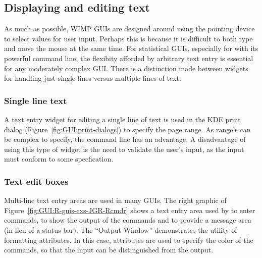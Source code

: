 \subsection{Displaying and editing text}
\label{sec:GUI:text-widgets}

As much as possible, WIMP GUIs are designed around using the pointing
device to select values for user input. Perhaps this is because it is
difficult to both type and move the mouse at the same time. For
statistical GUIs, especially for \R\/ with its powerful command line,
the flexibity afforded by arbitrary text entry is essential for any
moderately complex GUI. There is a distinction made between widgets
for handling just single lines versus multiple lines of text.

\subsubsection{Single line text}
\label{sec:GUI:single-line-text}

A text entry widget for editing a single line of text is used in the
KDE print dialog (Figure~\ref{fig:GUI:print-dialogs}) to specify
the page range. As range's can be complex to specify, the command line
has an advantage. A disadvantage of using this type of widget is the need to
validate the user's input, as the input must conform to some specfication.

\subsubsection{Text edit boxes}
\label{sec:GUI:textboxes}

Multi-line text entry areas are used in many GUIs. The right graphic
of Figure~\ref{fig:GUI:R-guis-exs-JGR-Rcmdr} shows a text entry area
used by  to enter \R\/ commands, to show the output of the
commands and to provide a message area (in lieu of a status bar). The
``Output Window'' demonstrates the utility of formatting
attributes. In this case, attributes are used to specify the color of
the commands, so that the input can be distinguished from the output.

